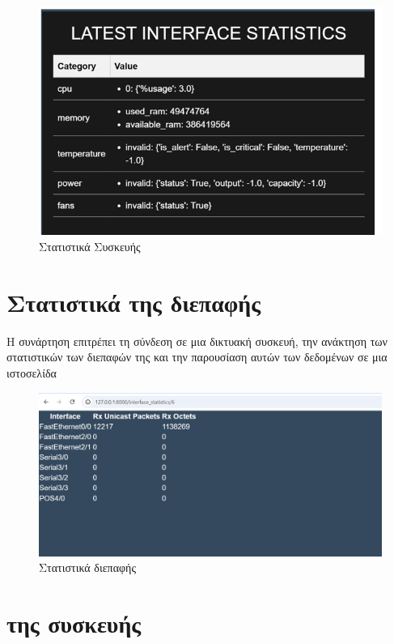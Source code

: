 \begin{figure}[h]
	\centering
	\includegraphics[width=1.0\textwidth]{graphics/device_statistics_response.png}
	\caption{Στατιστικά Συσκευής}
\end{figure}

\FloatBarrier


\section{Στατιστικά της διεπαφής}

Η συνάρτηση επιτρέπει τη σύνδεση σε μια δικτυακή συσκευή, την ανάκτηση των στατιστικών των διεπαφών της και την παρουσίαση αυτών των δεδομένων σε μια ιστοσελίδα

\FloatBarrier

\begin{figure}[h]
	\centering
	\includegraphics[width=1.0\textwidth]{graphics/interface_statistics.png}
	\caption{Στατιστικά διεπαφής}
\end{figure}


\section{ της συσκευής}

